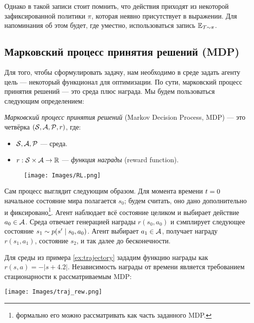 Однако в такой записи стоит помнить, что действия приходят из некоторой зафиксированной политики $\pi$, которая неявно присутствует в выражении. Для напоминания об этом будет, где уместно, использоваться запись $\mathbb{E}_{\mathcal{T} \sim \pi}$.

\subsection{Марковский процесс принятия решений (MDP)}

Для того, чтобы сформулировать задачу, нам необходимо в среде задать агенту цель --- некоторый функционал для оптимизации. По сути, марковский процесс принятия решений --- это среда плюс награда. Мы будем пользоваться следующим определением:

\begin{definition} 
\emph{Марковский процесс принятия решений} (Markov Decision Process, MDP) --- это четвёрка $(\mathcal{S}, \mathcal{A}, \mathcal{P}, r)$, где: 
\begin{itemize}
    \item $\mathcal{S}, \mathcal{A}, \mathcal{P}$ --- среда.
    \item $r: \mathcal{S} \times \mathcal{A} \to \mathbb{R}$ --- \emph{функция награды} (reward function).
\end{itemize}
\end{definition}

\begin{wrapfigure}{r}{0.5\textwidth}
\vspace{-0.4cm}
\centering
\texttt{[image: Images/RL.png]}
\vspace{-0.8cm}
\end{wrapfigure}

Сам процесс выглядит следующим образом. Для момента времени $t \HM= 0$ начальное состояние мира полагается $s_0$; будем считать, оно дано дополнительно и фиксировано\footnote{формально его можно рассматривать как часть заданного MDP.}. Агент наблюдает всё состояние целиком и выбирает действие $a_0 \HM\in \A$. Среда отвечает генерацией награды $r(s_0, a_0)$ и сэмплирует следующее состояние $s_1 \HM\sim p(s' \HM\mid s_0, a_0)$. Агент выбирает $a_1 \HM\in \A$, получает награду $r(s_1, a_1)$, состояние $s_2$, и так далее до бесконечности.

\begin{example}
Для среды из примера \ref{ex:trajectory} зададим функцию награды как $r(s, a) = -|s + 4.2|$. Независимость награды от времени является требованием стационарности к рассматриваемым MDP:
\begin{center}
\texttt{[image: Images/traj\_rew.png]}
\end{center}
\end{example}

